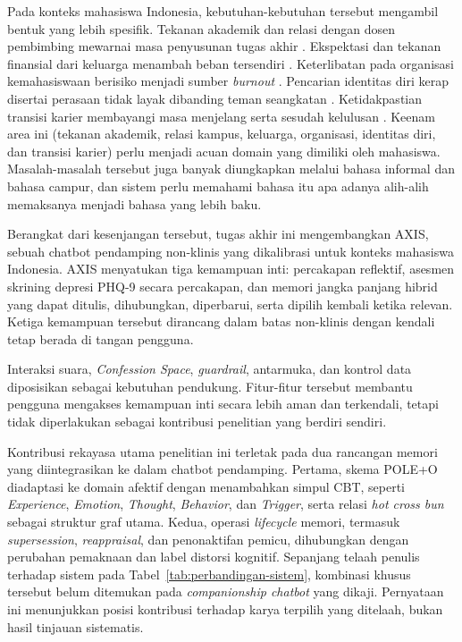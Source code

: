 Pada konteks mahasiswa Indonesia, kebutuhan-kebutuhan tersebut mengambil bentuk yang lebih spesifik. Tekanan akademik dan relasi dengan dosen pembimbing mewarnai masa penyusunan tugas akhir \parencite{pusparini2025thesisstress}. Ekspektasi dan tekanan finansial dari keluarga menambah beban tersendiri \parencite{mardhiyah2026parentalpressure}. Keterlibatan pada organisasi kemahasiswaan berisiko menjadi sumber \textit{burnout} \parencite{octaviani2023organizationalburnout}. Pencarian identitas diri kerap disertai perasaan tidak layak dibanding teman seangkatan \parencite{pakozdy2024impostor}. Ketidakpastian transisi karier membayangi masa menjelang serta sesudah kelulusan \parencite{yang2025employmentanxiety}. Keenam area ini (tekanan akademik, relasi kampus, keluarga, organisasi, identitas diri, dan transisi karier) perlu menjadi acuan domain yang dimiliki oleh mahasiswa. Masalah-masalah tersebut juga banyak diungkapkan melalui bahasa informal dan bahasa campur, dan sistem perlu memahami bahasa itu apa adanya alih-alih memaksanya menjadi bahasa yang lebih baku.

Berangkat dari kesenjangan tersebut, tugas akhir ini mengembangkan AXIS, sebuah chatbot pendamping non-klinis yang dikalibrasi untuk konteks mahasiswa Indonesia. AXIS menyatukan tiga kemampuan inti: percakapan reflektif, asesmen skrining depresi PHQ-9 secara percakapan, dan memori jangka panjang hibrid yang dapat ditulis, dihubungkan, diperbarui, serta dipilih kembali ketika relevan. Ketiga kemampuan tersebut dirancang dalam batas non-klinis dengan kendali tetap berada di tangan pengguna.

Interaksi suara, \textit{Confession Space}, \textit{guardrail}, antarmuka, dan kontrol data diposisikan sebagai kebutuhan pendukung. Fitur-fitur tersebut membantu pengguna mengakses kemampuan inti secara lebih aman dan terkendali, tetapi tidak diperlakukan sebagai kontribusi penelitian yang berdiri sendiri.

Kontribusi rekayasa utama penelitian ini terletak pada dua rancangan memori yang diintegrasikan ke dalam chatbot pendamping. Pertama, skema POLE+O diadaptasi ke domain afektif dengan menambahkan simpul CBT, seperti \textit{Experience}, \textit{Emotion}, \textit{Thought}, \textit{Behavior}, dan \textit{Trigger}, serta relasi \textit{hot cross bun} sebagai struktur graf utama. Kedua, operasi \textit{lifecycle} memori, termasuk \textit{supersession}, \textit{reappraisal}, dan penonaktifan pemicu, dihubungkan dengan perubahan pemaknaan dan label distorsi kognitif. Sepanjang telaah penulis terhadap sistem pada Tabel~\ref{tab:perbandingan-sistem}, kombinasi khusus tersebut belum ditemukan pada \textit{companionship chatbot} yang dikaji. Pernyataan ini menunjukkan posisi kontribusi terhadap karya terpilih yang ditelaah, bukan hasil tinjauan sistematis.

